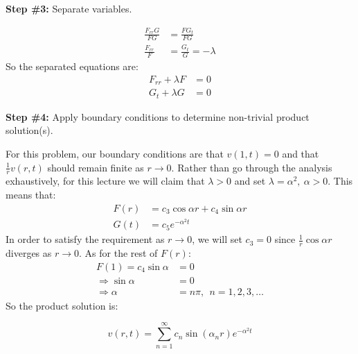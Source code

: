 \vspace{0.25cm}

\noindent\textbf{Step \#3:} Separate variables.

\begin{align*}
\frac{F_{rr}G}{FG} &= \frac{FG_t}{FG} \\
\frac{F_{rr}}{F} &= \frac{G_t}{G} = -\lambda
\end{align*}
So the separated equations are:
\begin{align*}
F_{rr} + \lambda F&= 0 \\
G_{t} + \lambda G &= 0
\end{align*}

\vspace{0.25cm}

\noindent\textbf{Step \#4:} Apply boundary conditions to determine non-trivial product solution(s).

\vspace{0.25cm}

\noindent For this problem, our boundary conditions are that $v(1,t) = 0$ and that $\frac{1}{r}v(r,t)$ should remain finite as $r \to 0$.  Rather than go through the analysis exhaustively, for this lecture we will claim that $\lambda > 0$ and set $\lambda = \alpha^2, \ \alpha>0$. This means that:
\begin{align*}
F(r) &= c_3\cos{\alpha r} + c_4\sin{\alpha r} \\
G(t) &= c_5e^{-\alpha^2 t}
\end{align*}
In order to satisfy the requirement as $r \to 0$, we will set $c_3 = 0$ since $\frac{1}{r}\cos{\alpha r}$ diverges as $r \to 0$.  As for the rest of $F(r)$:
\begin{align*}
F(1) = c_4\sin{\alpha} &= 0 \\
\Rightarrow \sin{\alpha} &= 0 \\
\Rightarrow \alpha &= n \pi, \ \ n=1,2,3,\dots
\end{align*}
So the product solution is:

\begin{equation}
v(r,t) = \sum\limits_{n=1}^{\infty} c_n \sin{(\alpha_n r)}e^{-\alpha^2 t}
\label{eq:lec35-ex-sol-v}
\end{equation}

\vspace{0.25cm}

